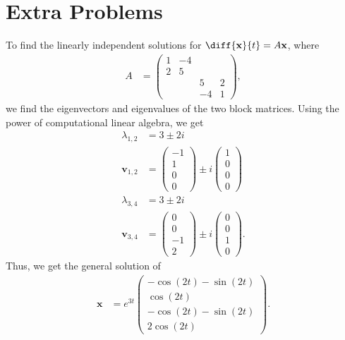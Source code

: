\documentclass[10pt]{mypackage}
\begin{document}
\section{Extra Problems}%
\begin{solution}
To find the linearly independent solutions for $\diff{\mathbf{x}}{t} = A \mathbf{x}$, where
\begin{align*}
  A &= \begin{pmatrix}1 & -4 & & \\ 2 & 5 & & \\ & & 5 & 2 \\ & & -4 & 1\end{pmatrix},
\end{align*}
we find the eigenvectors and eigenvalues of the two block matrices. Using the power of computational linear algebra, we get
\begin{align*}
  \lambda_{1,2} &= 3\pm 2i\\
  \mathbf{v}_{1,2} &= \begin{pmatrix}-1\\1\\0\\0\end{pmatrix} \pm i \begin{pmatrix}1\\0\\0\\0\end{pmatrix}\\
  \lambda_{3,4} &= 3\pm 2i\\
  \mathbf{v}_{3,4} &= \begin{pmatrix}0\\0\\-1\\2\end{pmatrix} \pm i \begin{pmatrix}0\\0\\1\\0\end{pmatrix}.
\end{align*}
Thus, we get the general solution of
\begin{align*}
  \mathbf{x} &= e^{3t} \begin{pmatrix}-\cos\left( 2t \right)-\sin\left(2t\right) \\ \cos\left(2t\right) \\ -\cos\left(2t\right)-\sin\left(2t\right) \\ 2\cos\left(2t\right)\end{pmatrix}.
\end{align*}
\end{solution}
\end{document}
